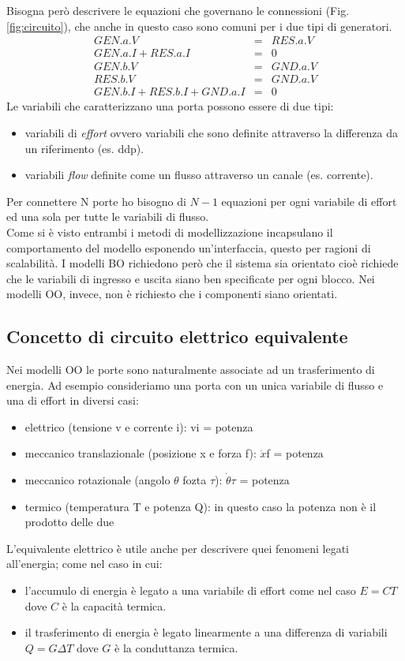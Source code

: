Bisogna però descrivere le equazioni che governano le connessioni (Fig. \ref{fig:circuito}), che anche in questo caso sono comuni per i due tipi di generatori.\\
\begin{eqnarray}
GEN.a.V &=& RES.a.V\\
GEN.a.I + RES.a.I &=& 0\\
GEN.b.V &=& GND.a.V\\
RES.b.V &=& GND.a.V\\
GEN.b.I + RES.b.I + GND.a.I &=& 0
\end{eqnarray}
Le variabili che caratterizzano una porta possono essere di due tipi:
\begin{itemize}
\item variabili di \emph{effort} ovvero variabili che sono definite attraverso la differenza da un riferimento (es. ddp).
\item variabili \emph{flow} definite come un flusso attraverso un canale (es. corrente).
\end{itemize}
Per connettere N porte ho bisogno di $N-1$ equazioni per ogni variabile di effort ed una sola per tutte le variabili di flusso.\\
Come si è visto entrambi i metodi di modellizzazione incapsulano il comportamento del modello esponendo un'interfaccia, questo per ragioni di scalabilità. I modelli BO richiedono però che il sistema sia orientato cioè richiede che le variabili di ingresso e uscita siano ben specificate per ogni blocco. Nei modelli OO, invece, non è richiesto che i componenti siano orientati.

\subsection{Concetto di circuito elettrico equivalente}
Nei modelli OO le porte sono naturalmente associate ad un trasferimento di energia. Ad esempio consideriamo una porta con un unica variabile di flusso e una di effort in diversi casi:
\begin{itemize}
\item elettrico (tensione v e corrente i): vi = potenza
\item meccanico translazionale (posizione x e forza f): $\dot{x}$f = potenza
\item meccanico rotazionale (angolo $\theta$ fozta $\tau$): $\dot{\theta}\tau$ = potenza
\item termico (temperatura T e potenza Q): in questo caso la potenza non è il prodotto delle due
\end{itemize}
L'equivalente elettrico è utile anche per descrivere quei fenomeni legati all'energia; come nel caso in cui:
\begin{itemize}
\item l'accumulo di energia è legato a una variabile di effort come nel caso $E=CT$ dove $C$ è la capacità termica.
\item il trasferimento di energia è legato linearmente a una differenza di variabili $Q=G\Delta T$ dove $G$ è la conduttanza termica.
\end{itemize}
